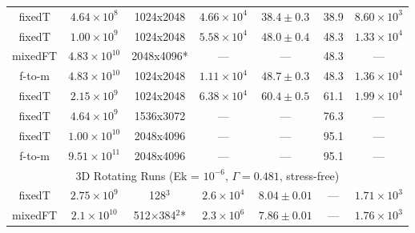 \documentclass[aps, pre, onecolumn, nofootinbib, notitlepage, groupedaddress, amsfonts, amssymb, amsmath, longbibliography]{revtex4-1}
\begin{document}
\begin{table}[ht]
\begin{center}
\begin{tabularx}{\textwidth}{c c c c c c c}
fixedT	&	$4.64 \times 10^8$		&	1024x2048	&	$4.66 \times 10^4$	&	$38.4 \pm 0.3$	&	38.9	&	$8.60 \times 10^3$ \\
fixedT	&	$1.00 \times 10^9$		&	1024x2048	&	$5.58 \times 10^4$	&	$48.0 \pm 0.4$	&	48.3	&	$1.33 \times 10^4$ \\
mixedFT	&	$4.83 \times 10^{10}$	&	2048x4096*	&	---					&	---				&	48.3	&	--- \\
f-to-m	&	$4.83 \times 10^{10}$	&	1024x2048	&	$1.11 \times 10^4$	&	$48.7 \pm 0.3$	&	48.3	&	$1.36 \times 10^4$ \\
fixedT	&	$2.15 \times 10^9$		&	1024x2048	&	$6.38 \times 10^4$	&	$60.4 \pm 0.5$	&	61.1	&	$1.99 \times 10^4$ \\
fixedT	&	$4.64 \times 10^9$		&	1536x3072	&	---					&	---				&	76.3	&	--- \\
fixedT	&	$1.00 \times 10^{10}$	&	2048x4096	&	---					&	---				&	95.1	&	--- \\
f-to-m	&	$9.51 \times 10^{11}$	&	2048x4096	&	---					&	---				&	95.1	&	--- \\
\hline																	
\multicolumn{7}{c}{\vspace{0.1cm}3D Rotating Runs (Ek = $10^{-6}$, $\Gamma = 0.481$, stress-free)} \\
\hline																	
fixedT	&	$2.75 \times 10^9$		&	128$^3$				&	$2.6 \times 10^4$	&	$8.04 \pm 0.01$	&	---		&	$1.71 \times 10^3$ \\
mixedFT	&	$2.1 \times 10^{10}$	&	512$\times$384$^2$*	&	$2.3 \times 10^6$	&	$7.86 \pm 0.01$	&	---		&	$1.76 \times 10^3$ \\
\hline																	
\end{tabularx}
\end{center}
\end{table}
\end{document}
